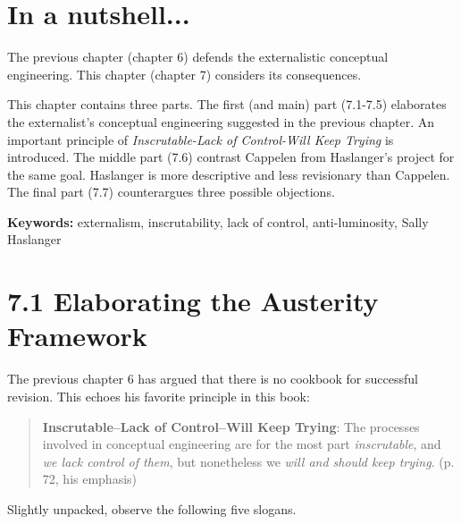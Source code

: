 \documentclass[
10pt, %
a4paper, %
twocolumn, %
landscape %
]{article}
\begin{document}
\pagestyle{myheadings} %
\markright{\doctitle} %


\thispagestyle{plain} %

\printtitle %


\section*{In a nutshell... }
The previous chapter (chapter 6) defends the externalistic conceptual engineering.
This chapter (chapter 7) considers its consequences.

This chapter contains three parts.
The first (and main) part (7.1-7.5) elaborates the externalist's conceptual engineering suggested in the previous chapter.
An important principle of \emph{Inscrutable-Lack of Control-Will Keep Trying} is introduced.
The middle part (7.6) contrast Cappelen from Haslanger's project for the same goal. Haslanger is more descriptive and less revisionary than Cappelen.
The final part (7.7) counterargues three possible objections.

\noindent \textbf{Keywords:} externalism, inscrutability, lack of control, anti-luminosity, Sally Haslanger

\section*{7.1 Elaborating the Austerity Framework}
The previous chapter 6 has argued that there is no cookbook for successful revision.
This echoes his favorite principle in this book:
\begin{quote}
\textbf{Inscrutable--Lack of Control--Will Keep Trying}: The processes involved in conceptual engineering are for the most part \emph{inscrutable}, and \emph{we lack control of them}, but nonetheless we \emph{will and should keep trying}.
(p. 72, his emphasis)
\end{quote}

Slightly unpacked, observe the following five slogans.
\end{document}
